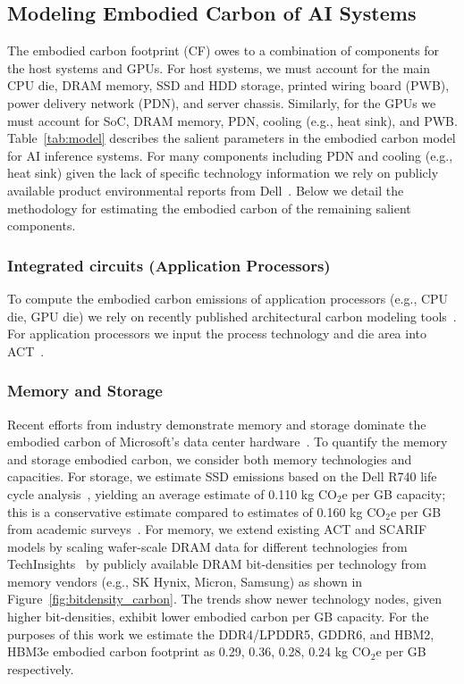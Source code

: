 \subsection{Modeling Embodied Carbon of AI Systems}

The embodied carbon footprint (CF) owes to a combination of components for the host systems and GPUs. 
For host systems, we must account for the main CPU die, DRAM memory, SSD and HDD storage, printed wiring board (PWB), power delivery network (PDN), and server chassis.
Similarly, for the GPUs we must account for SoC, DRAM memory, PDN, cooling (e.g., heat sink), and PWB.
Table~\ref{tab:model} describes the salient parameters in the embodied carbon model for AI inference systems.
For many components including PDN and cooling (e.g., heat sink) given the lack of specific technology information we rely on publicly available product environmental reports from Dell~\cite{dellr740}.
Below we detail the methodology for estimating the embodied carbon of the remaining salient components. 

\subsubsection{Integrated circuits (Application Processors)} 
To compute the embodied carbon emissions of application processors (e.g., CPU die, GPU die) we rely on recently published architectural carbon modeling tools~\cite{ACT, SCARIF, imec-dtco20, eeckhout2024focal}.
For application processors we input the process technology and die area into ACT~\cite{ACT, imec-dtco20}.






\subsubsection{Memory and Storage}
Recent efforts from industry demonstrate memory and storage dominate the embodied carbon of Microsoft's data center hardware~\cite{greensku}.
To quantify the memory and storage embodied carbon, we consider both memory technologies and capacities.
For storage, we estimate SSD emissions based on the Dell R740 life cycle analysis~\cite{dellr740}, yielding an average estimate of 0.110 kg CO$_2$e per GB capacity; this is a conservative estimate compared to estimates of 0.160 kg CO$_2$e per GB from academic surveys~\cite{dirty_ssd}.
For memory, we extend existing ACT and SCARIF models by scaling wafer-scale DRAM data for different technologies from TechInsights~\cite{TechInsights,techinsights_micron_dram_2024,skhynixHynixNewsroom} by publicly available DRAM bit-densities per technology from memory vendors (e.g., SK Hynix, Micron, Samsung) as shown in Figure~\ref{fig:bitdensity_carbon}. 
The trends show newer technology nodes, given higher bit-densities, exhibit lower embodied carbon per GB capacity.
For the purposes of this work we estimate the DDR4/LPDDR5, GDDR6, and HBM2, HBM3e embodied carbon footprint as 0.29, 0.36, 0.28, 0.24 kg CO$_2$e per GB respectively.







